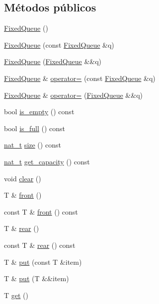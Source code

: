 \subsection*{Métodos públicos}
\begin{DoxyCompactItemize}
\item 
\hyperlink{class_designar_1_1_fixed_queue_ad55d01ff85b7d38e595ff2bd891a45b9}{Fixed\+Queue} ()
\item 
\hyperlink{class_designar_1_1_fixed_queue_a3e6393f6dbe99bbecb030f0a793892b8}{Fixed\+Queue} (const \hyperlink{class_designar_1_1_fixed_queue}{Fixed\+Queue} \&q)
\item 
\hyperlink{class_designar_1_1_fixed_queue_a74d27c0f06b0b91c34768f7501a77afd}{Fixed\+Queue} (\hyperlink{class_designar_1_1_fixed_queue}{Fixed\+Queue} \&\&q)
\item 
\hyperlink{class_designar_1_1_fixed_queue}{Fixed\+Queue} \& \hyperlink{class_designar_1_1_fixed_queue_a317293ac30aa85f82daf9a2c1e295e9a}{operator=} (const \hyperlink{class_designar_1_1_fixed_queue}{Fixed\+Queue} \&q)
\item 
\hyperlink{class_designar_1_1_fixed_queue}{Fixed\+Queue} \& \hyperlink{class_designar_1_1_fixed_queue_aac0f8bc7f8ffacc543bac5917d8b1045}{operator=} (\hyperlink{class_designar_1_1_fixed_queue}{Fixed\+Queue} \&\&q)
\item 
bool \hyperlink{class_designar_1_1_fixed_queue_aa72d9c9dd2ce251b6d29b31c04ee6517}{is\+\_\+empty} () const
\item 
bool \hyperlink{class_designar_1_1_fixed_queue_a4d6bdd5d75d476d4af602781bd0d5b56}{is\+\_\+full} () const
\item 
\hyperlink{namespace_designar_aa72662848b9f4815e7bf31a7cf3e33d1}{nat\+\_\+t} \hyperlink{class_designar_1_1_fixed_queue_a9fa2f855edd54de0c847c8ba35c804cf}{size} () const
\item 
\hyperlink{namespace_designar_aa72662848b9f4815e7bf31a7cf3e33d1}{nat\+\_\+t} \hyperlink{class_designar_1_1_fixed_queue_a786767a9a56c0c4b1e93631b509f0fa1}{get\+\_\+capacity} () const
\item 
void \hyperlink{class_designar_1_1_fixed_queue_ae5e1454766e792f8dbad9f1b49437fe6}{clear} ()
\item 
T \& \hyperlink{class_designar_1_1_fixed_queue_a2440b268443093f6ff306e956d7f0616}{front} ()
\item 
const T \& \hyperlink{class_designar_1_1_fixed_queue_ab86601d018b664a2f0d522bca18ee107}{front} () const
\item 
T \& \hyperlink{class_designar_1_1_fixed_queue_a820470e5e649e48a352b334f158c8eb3}{rear} ()
\item 
const T \& \hyperlink{class_designar_1_1_fixed_queue_ab634bd79b51287ddbcd1ba24bc72fcae}{rear} () const
\item 
T \& \hyperlink{class_designar_1_1_fixed_queue_ab8a9bf0adeaa3995e68d966d8a986904}{put} (const T \&item)
\item 
T \& \hyperlink{class_designar_1_1_fixed_queue_a66a9b9f7118ec4943f7af273879c6b52}{put} (T \&\&item)
\item 
T \hyperlink{class_designar_1_1_fixed_queue_aefa2e40721df2aff9ba56a2ef1f9db62}{get} ()
\end{DoxyCompactItemize}


